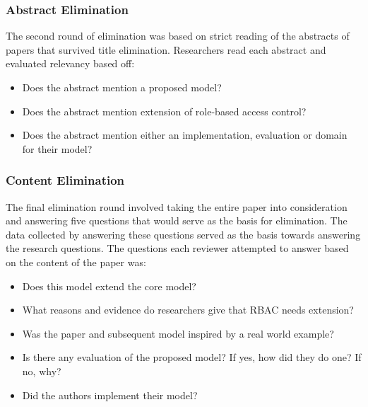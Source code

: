 \subsubsection{Abstract Elimination}

The second round of elimination was based on strict reading of the abstracts of papers that survived title elimination.  Researchers read each abstract and evaluated relevancy based off:

\begin{itemize}
\item Does the abstract mention a proposed model?
\item Does the abstract mention extension of role-based access control?
\item Does the abstract mention either an implementation, evaluation or domain for their model?
\end{itemize}

\subsubsection{Content Elimination}

The final elimination round involved taking the entire paper into consideration and answering five questions that would serve as the basis for elimination.  The data collected by answering these questions served as the basis towards answering the research questions.  The questions each reviewer attempted to answer based on the content of the paper was:

\begin{itemize}
\item Does this model extend the core model?
\item What reasons and evidence do researchers give that RBAC needs extension?
\item Was the paper and subsequent model inspired by a real world example?
\item Is there any evaluation of the proposed model? If yes, how did they do one? If no, why?
\item Did the authors implement their model?
\end{itemize}
